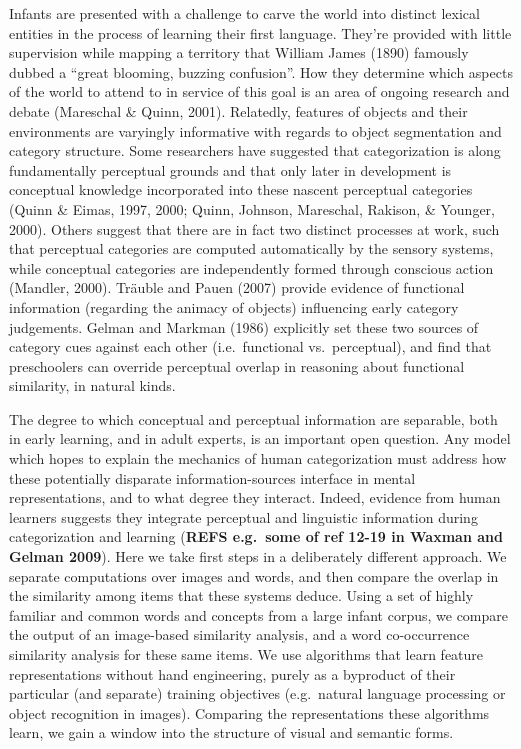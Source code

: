 \documentclass[10pt, letterpaper]{article}
\begin{document}
Infants are presented with a challenge to carve the world into distinct
lexical entities in the process of learning their first language.
They're provided with little supervision while mapping a territory that
William James (1890) famously dubbed a ``great blooming, buzzing
confusion''. How they determine which aspects of the world to attend to
in service of this goal is an area of ongoing research and debate
(Mareschal \& Quinn, 2001). Relatedly, features of objects and their
environments are varyingly informative with regards to object
segmentation and category structure. Some researchers have suggested
that categorization is along fundamentally perceptual grounds and that
only later in development is conceptual knowledge incorporated into
these nascent perceptual categories (Quinn \& Eimas, 1997, 2000; Quinn,
Johnson, Mareschal, Rakison, \& Younger, 2000). Others suggest that
there are in fact two distinct processes at work, such that perceptual
categories are computed automatically by the sensory systems, while
conceptual categories are independently formed through conscious action
(Mandler, 2000). Träuble and Pauen (2007) provide evidence of functional
information (regarding the animacy of objects) influencing early
category judgements. Gelman and Markman (1986) explicitly set these two
sources of category cues against each other (i.e.~functional
vs.~perceptual), and find that preschoolers can override perceptual
overlap in reasoning about functional similarity, in natural kinds.

The degree to which conceptual and perceptual information are separable,
both in early learning, and in adult experts, is an important open
question. Any model which hopes to explain the mechanics of human
categorization must address how these potentially disparate
information-sources interface in mental representations, and to what
degree they interact. Indeed, evidence from human learners suggests they
integrate perceptual and linguistic information during categorization
and learning (\textbf{REFS e.g.~some of ref 12-19 in Waxman and Gelman
2009}). Here we take first steps in a deliberately different approach.
We separate computations over images and words, and then compare the
overlap in the similarity among items that these systems deduce. Using a
set of highly familiar and common words and concepts from a large infant
corpus, we compare the output of an image-based similarity analysis, and
a word co-occurrence similarity analysis for these same items. We use
algorithms that learn feature representations without hand engineering,
purely as a byproduct of their particular (and separate) training
objectives (e.g.~natural language processing or object recognition in
images). Comparing the representations these algorithms learn, we gain a
window into the structure of visual and semantic forms.
\end{document}
